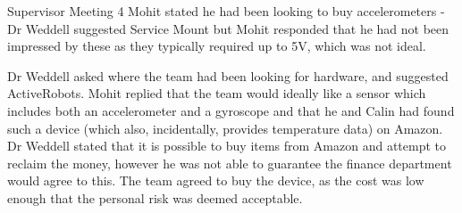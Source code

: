\documentclass{article}
\begin{document}
\begin{Minutes}{Supervisor Meeting 4}
Mohit stated he had been looking to buy accelerometers - Dr Weddell suggested Service Mount but Mohit responded that he had not been impressed by these as they typically required up to 5V, which was not ideal.

Dr Weddell asked where the team had been looking for hardware, and suggested ActiveRobots. Mohit replied that the team would ideally like a sensor which includes both an accelerometer and a gyroscope and that he and Calin had found such a device (which also, incidentally, provides temperature data) on Amazon. Dr Weddell stated that it is possible to buy items from Amazon and attempt to reclaim the money, however he was not able to guarantee the finance department would agree to this.
The team agreed to buy the device, as the cost was low enough that the personal risk was deemed acceptable.


\end{Minutes}
\end{document}
